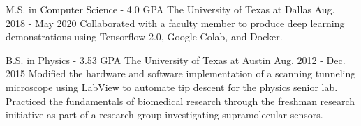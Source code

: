 

\begin{cventries}
  \cventry
    {M.S. in Computer Science - 4.0 GPA} %
    {The University of Texas at Dallas} %
    {Aug. 2018 - May 2020} %
    {} %
    {
			Collaborated with a faculty member to produce deep learning
			demonstrations using Tensorflow 2.0, Google Colab, and Docker.
    }

  \cventry
    {B.S. in Physics - 3.53 GPA} %
    {The University of Texas at Austin} %
    {Aug. 2012 - Dec. 2015} %
    {} %
    {
			Modified the hardware and software implementation of a scanning
			tunneling microscope using LabView to automate tip descent for
			the physics senior lab.
			Practiced the fundamentals of biomedical research through the
			freshman research initiative as part of a research group
			investigating supramolecular sensors.
    }

\end{cventries}
